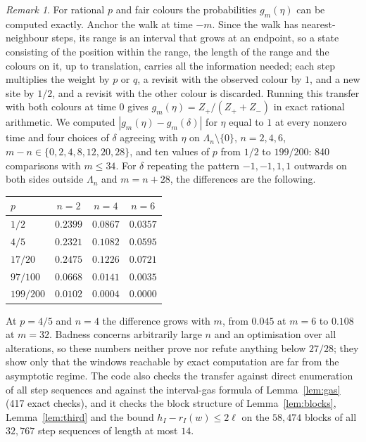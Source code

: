 \documentclass[11pt]{amsart}
\theoremstyle{remark}
\newtheorem{remark}[theorem]{Remark}
\begin{document}
\begin{remark}\label{rem:finite}
For rational $p$ and fair colours the probabilities $g_m(\eta)$ can be computed exactly. Anchor the walk at time $-m$.
Since the walk has nearest-neighbour steps, its range is an interval that grows at an endpoint, so a state consisting of the
position within the range, the length of the range and the colours on it, up to translation, carries all the
information needed; each step multiplies the weight by $p$ or $q$, a revisit with the observed colour by $1$, and a
new site by $1/2$, and a revisit with the other colour is discarded. Running this transfer with both colours at time $0$
gives $g_m(\eta)=Z_+/(Z_++Z_-)$ in exact rational arithmetic. We computed $|g_m(\eta)-g_m(\delta)|$ for $\eta$ equal to
$1$ at every nonzero time and four choices of $\delta$ agreeing with $\eta$ on $\Lambda_n\setminus\{0\}$, $n=2,4,6$,
$m-n\in\{0,2,4,8,12,20,28\}$, and ten values of $p$ from $1/2$ to $199/200$: 840 comparisons with $m\le34$. For
$\delta$ repeating the pattern $-1,-1,1,1$ outwards on both sides outside $\Lambda_n$ and $m=n+28$, the differences are
the following.
\begin{center}
\begin{tabular}{lccc}
\toprule
$p$ & $n=2$ & $n=4$ & $n=6$\\
\midrule
$1/2$ & $0.2399$ & $0.0867$ & $0.0357$\\
$4/5$ & $0.2321$ & $0.1082$ & $0.0595$\\
$17/20$ & $0.2475$ & $0.1226$ & $0.0721$\\
$97/100$ & $0.0668$ & $0.0141$ & $0.0035$\\
$199/200$ & $0.0102$ & $0.0004$ & $0.0000$\\
\bottomrule
\end{tabular}
\end{center}
At $p=4/5$ and $n=4$ the difference grows with $m$, from $0.045$ at $m=6$ to $0.108$ at $m=32$. Badness concerns
arbitrarily large $n$ and an optimisation over all alterations, so these numbers neither prove nor refute anything
below $27/28$; they show only that the windows reachable by exact computation are far from the asymptotic regime. The
code also checks the transfer against direct enumeration of all step sequences and against the interval-gas formula
of Lemma~\ref{lem:gas} (417 exact checks), and it checks the block structure of Lemma~\ref{lem:blocks},
Lemma~\ref{lem:third} and the bound $h_I-r_I(w)\le2\ell$ on the $58{,}474$ blocks of all $32{,}767$ step sequences of
length at most $14$.
\end{remark}
\end{document}
